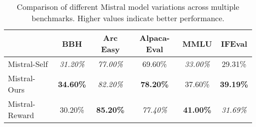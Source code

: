 \begin{table*}[h!]
\centering
{}

\begin{tabular}{l ccccc}
\hline
\rowcolor{apricot} 
\multirow{}{}{\textbf{Models}} & \textbf{BBH} & \textbf{Arc Easy} & \textbf{Alpaca-Eval} & \textbf{MMLU} & \textbf{IFEval} \\ \hline
Mistral-Self & \textit{31.20\%} & \textit{77.00\%} & 69.60\% & \textit{33.00\%} & 29.31\% \\ \hline
\rowcolor{lightgray}Mistral-Ours & \textbf{34.60\%} & \textit{82.20\%} & \textbf{78.20\%} & 37.60\% & \textbf{39.19\%} \\ \hline
Mistral-Reward & 30.20\% & \textbf{85.20\%} & \textit{77.40\%} & \textbf{41.00\%} & \textit{31.69\%} \\ \hline
\end{tabular}
\caption{Comparison of different Mistral model variations across multiple benchmarks. Higher values indicate better performance.}
\label{tab:benchmark_comparison}
\end{table*}
